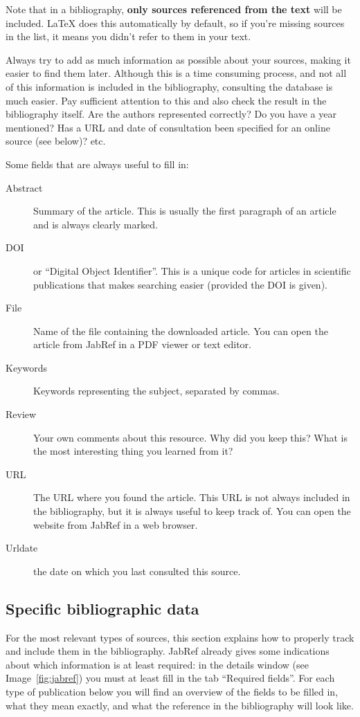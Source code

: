 Note that in a bibliography, \textbf{only sources referenced from the text} will be included. {\LaTeX} does this automatically by default, so if you're missing sources in the list, it means you didn't refer to them in your text.

Always try to add as much information as possible about your sources, making it easier to find them later. Although this is a time consuming process, and not all of this information is included in the bibliography, consulting the database is much easier. Pay sufficient attention to this and also check the result in the bibliography itself. Are the authors represented correctly? Do you have a year mentioned? Has a URL and date of consultation been specified for an online source (see below)? etc.

Some fields that are always useful to fill in:

\begin{description}
  \item[Abstract] Summary of the article. This is usually the first paragraph of an article and is always clearly marked.
  \item[DOI] or ``Digital Object Identifier''. This is a unique code for articles in scientific publications that makes searching easier (provided the DOI is given).
  \item[File] Name of the file containing the downloaded article. You can open the article from JabRef in a PDF viewer or text editor.
  \item[Keywords] Keywords representing the subject, separated by commas.
  \item[Review] Your own comments about this resource. Why did you keep this? What is the most interesting thing you learned from it?
  \item[URL] The URL where you found the article. This URL is not always included in the bibliography, but it is always useful to keep track of. You can open the website from JabRef in a web browser.
  \item[Urldate] the date on which you last consulted this source.
\end{description}

\subsection{Specific bibliographic data}
\label{sub:specific_bibliographic_data}

For the most relevant types of sources, this section explains how to properly track and include them in the bibliography. JabRef already gives some indications about which information is at least required: in the details window (see Image~\ref{fig:jabref}) you must at least fill in the tab ``Required fields''. For each type of publication below you will find an overview of the fields to be filled in, what they mean exactly, and what the reference in the bibliography will look like.

